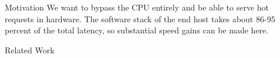 \begin{block}{Motivation}
We want to bypass the CPU entirely and be able to serve hot requests in
hardware. The software stack of the end host takes about 86-95 percent of the
total latency, so substantial speed gains can be made here.

\end{block}

\vspace{1ex}

\begin{block}{Related Work}
\end{block}
